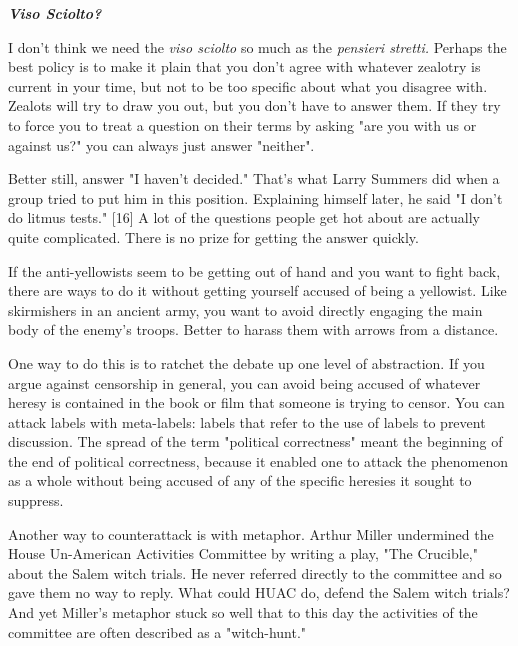 \textbf{\emph{Viso Sciolto?}}

I don't think we need the \emph{viso sciolto} so
                  much as the \emph{pensieri stretti.} Perhaps the best policy
                  is to make it plain that you don't agree with whatever
                  zealotry is current in your time, but not to be too specific
                  about what you disagree with. Zealots will try to draw you
                  out, but you don't have to answer them. If they try to force
                  you to treat a question on their terms by asking "are you with
                  us or against us?" you can always just answer "neither".

Better
                  still, answer "I haven't decided." That's what Larry Summers
                  did when a group tried to put him in this position. Explaining
                  himself later, he said "I don't do litmus tests." [16] A lot
                  of the questions people get hot about are actually quite
                  complicated. There is no prize for getting the answer
                  quickly.

If the anti-yellowists seem to be getting
                  out of hand and you want to fight back, there are ways to do
                  it without getting yourself accused of being a yellowist. Like
                  skirmishers in an ancient army, you want to avoid directly
                  engaging the main body of the enemy's troops. Better to harass
                  them with arrows from a distance.

One way to do
                  this is to ratchet the debate up one level of abstraction. If
                  you argue against censorship in general, you can avoid being
                  accused of whatever heresy is contained in the book or film
                  that someone is trying to censor. You can attack labels with
                  meta-labels: labels that refer to the use of labels to prevent
                  discussion. The spread of the term "political correctness"
                  meant the beginning of the end of political correctness,
                  because it enabled one to attack the phenomenon as a whole
                  without being accused of any of the specific heresies it
                  sought to suppress.

Another way to counterattack is
                  with metaphor. Arthur Miller undermined the House Un-American
                  Activities Committee by writing a play, "The Crucible," about
                  the Salem witch trials. He never referred directly to the
                  committee and so gave them no way to reply. What could HUAC
                  do, defend the Salem witch trials? And yet Miller's metaphor
                  stuck so well that to this day the activities of the committee
                  are often described as a "witch-hunt."

